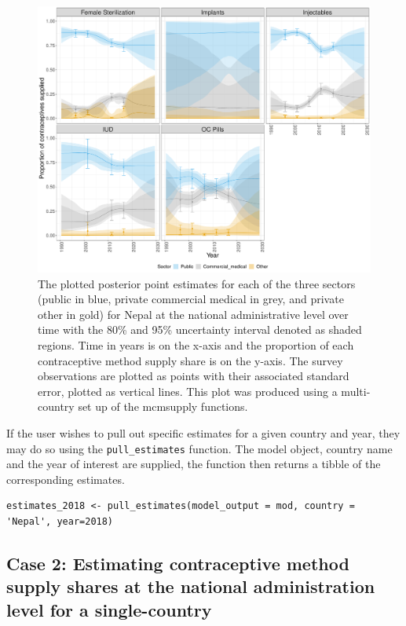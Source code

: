 \begin{figure}[H]
\includegraphics[width=1\linewidth,height=0.4\textheight]{figures/fig_3} \caption{The plotted posterior point estimates for each of the three sectors (public in blue, private commercial medical in grey, and private other in gold) for Nepal at the national administrative level over time with the 80\% and 95\% uncertainty interval denoted as shaded regions. Time in years is on the x-axis and the proportion of each contraceptive method supply share is on the y-axis. The survey observations are plotted as points with their associated standard error, plotted as vertical lines. This plot was produced using a multi-country set up of the mcmsupply functions.}\label{fig:fig-3}
\end{figure}

If the user wishes to pull out specific estimates for a given country and year, they may do so using the \texttt{pull\_estimates} function. The model object, country name and the year of interest are supplied, the function then returns a tibble of the corresponding estimates.

\begin{verbatim}
estimates_2018 <- pull_estimates(model_output = mod, country = 'Nepal', year=2018)
\end{verbatim}

\subsection{Case 2: Estimating contraceptive method supply shares at the national administration level for a single-country}\label{case-2-estimating-contraceptive-method-supply-shares-at-the-national-administration-level-for-a-single-country}

